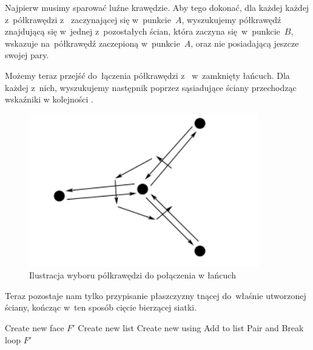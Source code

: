 \documentclass[skorowidz,autorrok,backref,xodstep,oswiadczenie]{wmimgr}
\begin{document}
Najpierw musimy sparować luźne krawędzie. Aby tego dokonać, dla każdej każdej z~półkrawędzi z~ zaczynającej się w~punkcie~$A$, wyszukujemy półkrawędź znajdującą się w~jednej z~pozostałych ścian, która zaczyna się~w~punkcie~$B$, wskazuje na~półkrawędź zaczepioną w~punkcie~$A$, oraz nie posiadającą jeszcze swojej pary.

Możemy teraz przejść do~łączenia półkrawędzi z~ w~zamknięty łańcuch. Dla każdej z~nich, wyszukujemy następnik poprzez sąsiadujące ściany przechodząc wskaźniki w kolejności .

\begin{figure}[ht!]
\centering
\includegraphics[width=100mm]{images/chain.png}
\caption{Ilustracja wyboru półkrawędzi do połączenia w łańcuch}
\label{chain}
\end{figure}

Teraz pozostaje nam tylko przypisanie płaszczyzny tnącej do~właśnie utworzonej ściany, kończąc w~ten sposób cięcie bierzącej siatki.

\begin{algorithm}
\caption{$BuildCutFace(V, P)$}
\label{BuildCutFace}
\begin{algorithmic}
    \STATE Create new face $F'$
    \STATE Create new list 
        \STATE Create new  using 
        \STATE Add  to list 
                \STATE Pair  and 
                \STATE Break loop
            \ENDIF
        \ENDFOR
    \ENDFOR
        \STATE {}
    \ENDFOR
    \STATE {}
    \RETURN $F'$
\end{algorithmic}
\end{algorithm}
\end{document}
